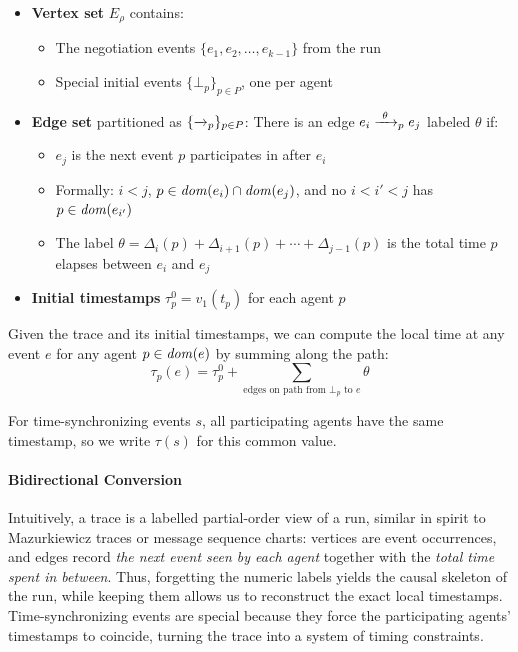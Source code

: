 \begin{itemize}
\item \textbf{Vertex set} $E_\rho$ contains:
  \begin{itemize}
  \item The negotiation events $\{e_1, e_2, \dots, e_{k-1}\}$ from the run
  \item Special initial events $\{\bot_p\}_{p\in P}$, one per agent
  \end{itemize}

\item \textbf{Edge set} partitioned as $\{\xrightarrow{}_p\}_{p \in P}$: There is an edge $e_i \xrightarrow{~\theta~}_p e_j$ labeled $\theta$ if:
  \begin{itemize}
  \item $e_j$ is the next event $p$ participates in after $e_i$
  \item Formally: $i < j$, $p \in \mathit{dom}(e_i) \cap \mathit{dom}(e_j)$, and no $i < i' < j$ has $p \in \mathit{dom}(e_{i'})$
  \item The label $\theta = \Delta_i(p) + \Delta_{i+1}(p) + \cdots + \Delta_{j-1}(p)$ is the total time $p$ elapses between $e_i$ and $e_j$
  \end{itemize}

\item \textbf{Initial timestamps} $\tau^0_p = v_1(t_p)$ for each agent $p$
\end{itemize}

Given the trace and its initial timestamps, we can compute the local time at any event $e$ for any agent $p \in \mathit{dom}(e)$ by summing along the path:
\[
\tau_p(e) = \tau^0_p + \sum_{\text{edges on path from } \bot_p \text{ to } e} \theta
\]

For time-synchronizing events $s$, all participating agents have the same timestamp, so we write $\tau(s)$ for this common value.

\paragraph*{Bidirectional Conversion}

Intuitively, a trace is a labelled partial-order view of a run, similar in spirit to Mazurkiewicz traces or message sequence charts:
vertices are event occurrences, and edges record \emph{the next event seen by each agent} together with the \emph{total time spent in between}.
Thus, forgetting the numeric labels yields the causal skeleton of the run, while keeping them allows us to reconstruct the exact local timestamps.
Time-synchronizing events are special because they force the participating agents' timestamps to coincide, turning the trace into a system of timing constraints.

